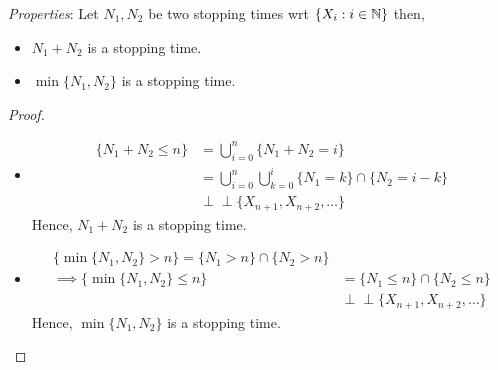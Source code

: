 \documentclass[a4paper,10pt, english]{article}
\begin{document}
\emph{Properties}: Let $N_1,N_2$ be two stopping times wrt $\{X_i : i \in \mathbb{N} \} $ then,
\begin{itemize}
	\item $N_1+N_2$ is a stopping time.
	\item $\min \{N_1,N_2\} $ is a stopping time.
\end{itemize}
\begin{proof}
\begin{itemize}
	\item 
	\begin{align*}
	\{N_1+N_2 \leq n\} &= \bigcup_{i=0}^{n} \{N_1+N_2 = i\}
	\\
	&= \bigcup_{i=0}^{n} \bigcup_{k=0}^{i} \{N_1 = k\} \cap \{N_2 = i-k\}
	\\
	& \!\perp\!\!\!\perp \{X_{n+1},X_{n+2},\ldots\}
	\end{align*}
	Hence, $N_1+N_2$ is a stopping time.
	\item 
	\begin{align*}
	\{\min \{N_1,N_2\} > n\} = \{N_1 > n\} \cap \{N_2 > n\}
	\\
	\implies \{\min \{N_1,N_2\} \leq n\} &= \{N_1 \leq n\} \cap \{N_2 \leq n\}
	\\
	& \!\perp\!\!\!\perp \{X_{n+1},X_{n+2},\ldots\}
	\end{align*}
	Hence, $\min \{N_1,N_2\} $ is a stopping time.
\end{itemize}
\end{proof}
\end{document}
